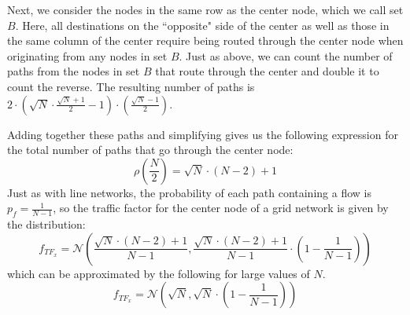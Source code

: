Next, we consider the nodes in the same row as the center node, which we call set $B$.  
Here, all destinations on the ``opposite" side of the center as well as those in the same column of the center require being routed through the center node when originating from any nodes in set $B$.  Just as above, we can count the number of paths from the nodes in set $B$ that route through the center and double it to count the reverse.  The resulting number of paths is $2 \cdot (\sqrt{N} \cdot \frac{\sqrt{N}+1}{2}-1) \cdot (\frac{\sqrt{N}-1}{2})$.
%

Adding together these paths and simplifying gives us the following expression for the total number of paths that go through the center node: 
\begin{equation}
	\rho(\frac{N}{2}) = \sqrt{N} \cdot (N-2) + 1
\end{equation}
Just as with line networks, the probability of each path containing a flow is $p_f = \frac{1}{N-1}$, so the traffic factor for the center node of a grid network is given by the distribution:
\begin{equation*}
	f_{TF_x} = \mathcal{N}( \frac{\sqrt{N} \cdot (N-2) + 1}{N-1}, \frac{\sqrt{N} \cdot (N-2) + 1}{N-1} \cdot ( 1 - \frac{1}{N-1} )  )
\end{equation*}
which can be approximated by the following for large values of $N$.  
\begin{equation*}
	f_{TF_x} = \mathcal{N}( \sqrt{N}, \sqrt{N} \cdot ( 1 - \frac{1}{N-1} )  )
\end{equation*}








